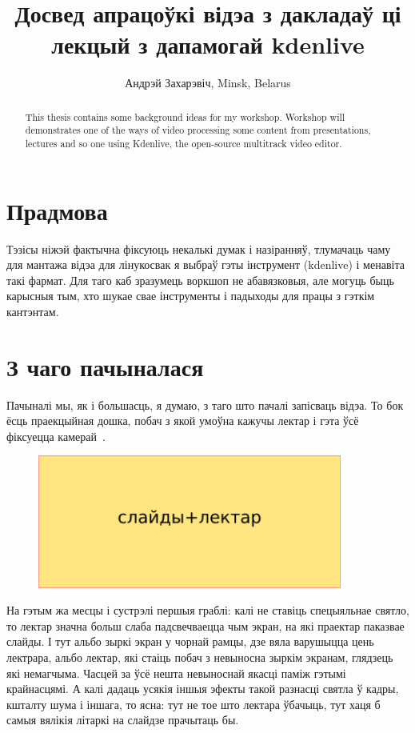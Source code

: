 \documentclass[10pt, a5paper]{article}
\begin{document}
\title{Досвед апрацоўкі відэа з дакладаў ці лекцый з дапамогай kdenlive}
\author{Андрэй Захарэвіч, Minsk, Belarus}
\maketitle
\begin{abstract}
This thesis contains some background ideas for my workshop. Workshop will demonstrates one of the ways of video processing some content from presentations, lectures and so one using \linebreak Kdenlive, the open-source multitrack video editor.
\end{abstract}
\section*{Прадмова}

Тэзісы ніжэй фактычна фіксуюць некалькі думак і назіранняў, тлумачаць чаму для мантажа відэа для лінукосвак я выбраў гэты інструмент (kdenlive) і менавіта такі фармат. Для таго каб зразумець воркшоп не абавязковыя, але могуць быць карысныя тым, хто шукае свае інструменты і падыходы для працы з гэткім кантэнтам.

\section*{З чаго пачыналася}

Пачыналі мы, як і большасць, я думаю, з таго што пачалі запісваць відэа. То бок ёсць праекцыйная дошка, побач з якой умоўна кажучы лектар і гэта ўсё фіксуецца камерай~\cite{Zakharevich1}.


\begin{figure}[h!]
  \centering
  \includegraphics[width=10cm]{32_2016_Zakharevich1.png}
\end{figure}

На гэтым жа месцы і сустрэлі першыя граблі: калі не ставіць спецыяльнае святло, то лектар значна больш слаба падсвечваецца чым экран, на які праектар паказвае слайды. І тут альбо зыркі экран у чорнай рамцы, дзе вяла варушыцца цень лектрара, альбо лектар, які стаіць побач з невыносна зыркім экранам, глядзець які немагчыма. Часцей за ўсё нешта невыноснай якасці паміж гэтымі крайнасцямі. А калі дадаць усякія іншыя эфекты такой разнасці святла ў кадры, кшталту шума і іншага, то ясна: тут не тое што лектара ўбачыць, тут хаця б самыя вялікія літаркі на слайдзе прачытаць бы.
\end{document}
